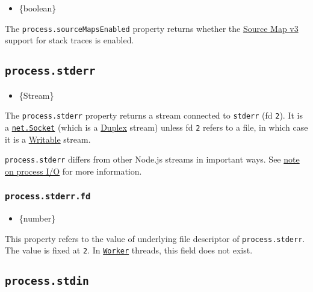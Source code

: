 \begin{itemize}
\tightlist
\item
  \{boolean\}
\end{itemize}

The \texttt{process.sourceMapsEnabled} property returns whether the
\href{https://sourcemaps.info/spec.html}{Source Map v3} support for
stack traces is enabled.

\subsection{\texorpdfstring{\texttt{process.stderr}}{process.stderr}}\label{process.stderr}

\begin{itemize}
\tightlist
\item
  \{Stream\}
\end{itemize}

The \texttt{process.stderr} property returns a stream connected to
\texttt{stderr} (fd \texttt{2}). It is a
\href{net.md\#class-netsocket}{\texttt{net.Socket}} (which is a
\href{stream.md\#duplex-and-transform-streams}{Duplex} stream) unless fd
\texttt{2} refers to a file, in which case it is a
\href{stream.md\#writable-streams}{Writable} stream.

\texttt{process.stderr} differs from other Node.js streams in important
ways. See \hyperref[a-note-on-process-io]{note on process I/O} for more
information.

\subsubsection{\texorpdfstring{\texttt{process.stderr.fd}}{process.stderr.fd}}\label{process.stderr.fd}

\begin{itemize}
\tightlist
\item
  \{number\}
\end{itemize}

This property refers to the value of underlying file descriptor of
\texttt{process.stderr}. The value is fixed at \texttt{2}. In
\href{worker_threads.md\#class-worker}{\texttt{Worker}} threads, this
field does not exist.

\subsection{\texorpdfstring{\texttt{process.stdin}}{process.stdin}}\label{process.stdin}

